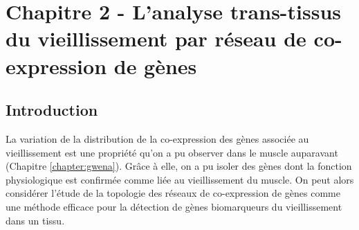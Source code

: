 \chapter{Chapitre 2 - L'analyse trans-tissus du vieillissement par réseau de co-expression de gènes}
\label{chapter:multidim}

\section{Introduction}

La variation de la distribution de la co-expression des gènes associée au vieillissement est une propriété qu'on a pu observer dans le muscle auparavant (Chapitre \ref{chapter:gwena}). Grâce à elle, on a pu isoler des gènes dont la fonction physiologique  est confirmée comme liée au vieillissement du muscle. On peut alors considérer l'étude de la topologie des réseaux de co-expression de gènes comme une méthode efficace pour la détection de gènes biomarqueurs du vieillissement dans un tissu. 

